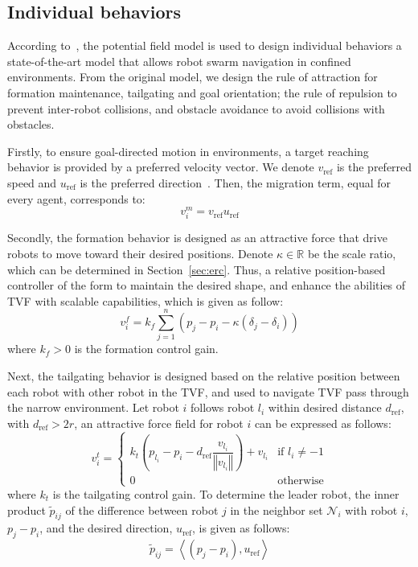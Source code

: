 \subsection{Individual behaviors}
According to~\cite{Vsrhelyi2018}, the potential field model is used to design individual behaviors a state-of-the-art model that allows robot swarm navigation in confined environments. From the original model, we design the rule of attraction for formation maintenance, tailgating and goal orientation; the rule of repulsion to prevent inter-robot collisions, and obstacle avoidance to avoid collisions with 
obstacles. 

Firstly, to ensure goal-directed motion in environments, a target reaching behavior is provided by a preferred velocity vector. We denote $v_\text{ref}$ is the preferred speed and $u_\text{ref}$ is the preferred direction~\cite{6095129}. Then, the migration term, equal for every agent, corresponds to:
\begin{equation}
    v_i^m=v_\text{ref}u_\text{ref}
\end{equation}

Secondly, the formation behavior is designed as an attractive force that drive robots to move toward their desired positions. Denote $\kappa\in\mathbb{R}$ be the scale ratio, which can be determined in Section~\ref{sec:erc}. Thus, a relative position-based controller of the form to maintain the desired shape, and enhance the abilities of TVF with scalable capabilities, which is given as follow:
\begin{equation}
    v^f_i=k_f\sum_{j=1}^n{\left(p_j-p_i-\kappa\left(\delta_j-\delta_i\right)\right)}
    \label{eqn:1uf}
\end{equation}
where $k_f>0$ is the formation control gain.

Next, the tailgating behavior is designed based on the relative position between each robot with other robot in the TVF, and used to navigate TVF pass through the narrow environment. Let robot $i$ follows robot ${l_i}$ within desired distance $d_\text{ref}$, with $d_\text{ref}>2r$,  an attractive force field for robot $i$ can be expressed as follows:
\begin{equation}
    v_i^t=\begin{cases}
k_t\left(p_{l_i}-p_i-d_\text{ref}\dfrac{v_{l_i}}{\left\Vert v_{l_i}\right\Vert}\right)+v_{l_i} & \text{if } l_i\neq-1\\
0 & \text{otherwise}
\end{cases}
    \label{eqn:1ut}
\end{equation}
where $k_t$ is the tailgating control gain. To determine the leader robot, the inner product $\tilde{p}_{ij}$ of the difference between robot $j$ in the neighbor set $\mathcal{N}_i$ with robot $i$, $p_j-p_i$, and the desired direction, $u_\text{ref}$, is given as follows:
\begin{equation}
    \tilde{p}_{ij} = \left\langle (p_j-p_i),u_\text{ref}\right\rangle
    \label{eqn:1tildep}
\end{equation}


